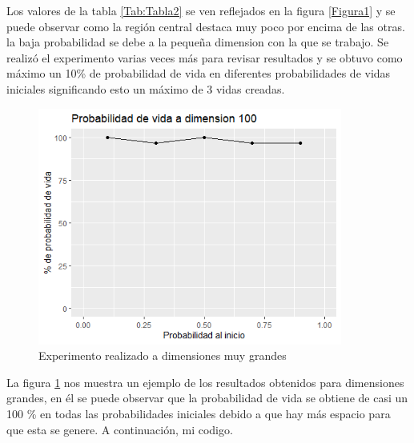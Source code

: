 \documentclass{article}
\begin{document}
Los valores de la tabla \ref{Tab:Tabla2} se ven reflejados en la figura \ref{Figura1}  y se puede observar como la región central destaca muy poco por encima de las otras. la baja probabilidad se debe a la pequeña dimension con la que se trabajo. Se realizó el experimento varias veces más para revisar resultados y se obtuvo como máximo un 10\% de probabilidad de vida en diferentes probabilidades de vidas iniciales significando esto un máximo de 3 vidas creadas. 

\begin{figure} [h!]%
    \centering
    \includegraphics[width=100mm]{Figura2.png} %
    \caption{Experimento realizado a dimensiones muy grandes}
    \label{Figura2}
\end{figure}

La figura \ref{Figura2} nos muestra un ejemplo de los resultados obtenidos para dimensiones grandes, en él se puede observar que la probabilidad de vida se obtiene de casi un 100 \% en todas las probabilidades iniciales debido a que hay más espacio para que esta se genere. A continuación, mi codigo.
\end{document}
